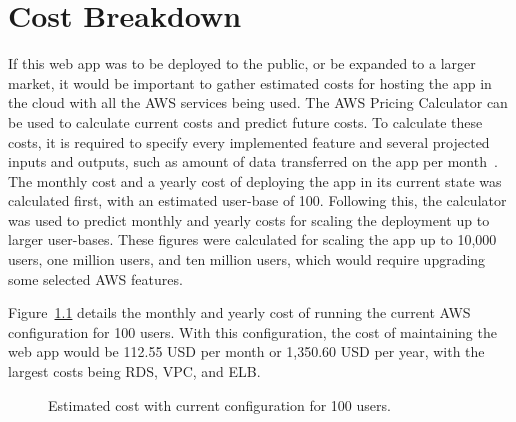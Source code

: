 \chapter{Cost Breakdown}\label{ch:cost-breakdown}
If this web app was to be deployed to the public, or be expanded to a larger market, it would be important to
gather estimated costs for hosting the app in the cloud with all the AWS services being used.
The AWS Pricing Calculator can be used to calculate current costs and predict future costs.
To calculate these costs, it is required to specify every implemented feature and several projected inputs and outputs,
such as amount of data transferred on the app per month~\parencite{amazon2022aws}.
The monthly cost and a yearly cost of deploying the app in its current state was calculated first, with an estimated
user-base of 100.
Following this, the calculator was used to predict monthly and yearly costs for scaling the deployment up to larger
user-bases.
These figures were calculated for scaling the app up to 10,000 users, one million users, and ten million users, which
would require upgrading some selected AWS features.

Figure~\ref{fig:100-users} details the monthly and yearly cost of running the current AWS configuration for 100 users.
With this configuration, the cost of maintaining the web app would be 112.55 USD per month or 1,350.60 USD per year,
with the largest costs being RDS, VPC, and ELB\@.

\begin{figure}[!htbp]
    \centering
    \hfill
    \caption{Estimated cost with current configuration for 100 users.}
    \label{fig:100-users}
\end{figure}



